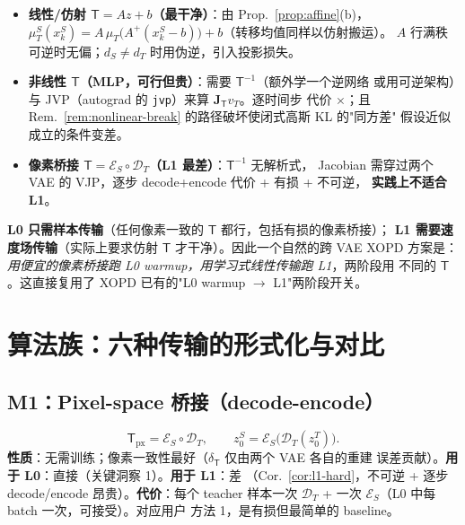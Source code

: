 \documentclass[11pt,a4paper]{article}
\newcommand{\Enc}{\mathcal{E}}
\newcommand{\Dec}{\mathcal{D}}
\newcommand{\Tmap}{\mathsf{T}}
\newcommand{\vT}{v_{T}}
\newcommand{\Jac}{\mathbf{J}}
\theoremstyle{definition}
\begin{document}
\begin{itemize}[leftmargin=1.4em]
\item \textbf{线性/仿射 $\Tmap=Az+b$（最干净）}：由 Prop.~\ref{prop:affine}(b)，
$\mu_T^S(x_k^S)=A\,\mu_T\big(A^{+}(x_k^S-b)\big)+b$（转移均值同样以仿射搬运）。
$A$ 行满秩可逆时无偏；$d_S\neq d_T$ 时用伪逆，引入投影损失。
\item \textbf{非线性 $\Tmap$（MLP，可行但贵）}：需要 $\Tmap^{-1}$（额外学一个逆网络
或用可逆架构）与 JVP（autograd 的 \texttt{jvp}）来算 $\Jac_{\Tmap}\vT$。逐时间步
代价 $\times$；且 Rem.~\ref{rem:nonlinear-break} 的路径破坏使闭式高斯 KL 的"同方差"
假设近似成立的条件变差。
\item \textbf{像素桥接 $\Tmap=\Enc_S\circ\Dec_T$（L1 最差）}：$\Tmap^{-1}$ 无解析式，
Jacobian 需穿过两个 VAE 的 VJP，逐步 decode+encode 代价 + 有损 + 不可逆，
\textbf{实践上不适合 L1}。
\end{itemize}

\begin{tcolorbox}[colback=green!4,colframe=green!50!black,title=关键洞察 2：L0/L1 对传输的要求是\emph{分层}的]
\textbf{L0 只需样本传输}（任何像素一致的 $\Tmap$ 都行，包括有损的像素桥接）；
\textbf{L1 需要速度场传输}（实际上要求仿射 $\Tmap$ 才干净）。因此一个自然的跨 VAE
XOPD 方案是：\emph{用便宜的像素桥接跑 L0 warmup，用学习式线性传输跑 L1}，两阶段用
不同的 $\Tmap$。这直接复用了 XOPD 已有的"L0 warmup $\to$ L1"两阶段开关。
\end{tcolorbox}

\section{算法族：六种传输的形式化与对比}
\label{sec:methods}

\subsection{M1：Pixel-space 桥接（decode-encode）}

\begin{equation}
\Tmap_{\mathrm{px}}=\Enc_S\circ\Dec_T,
\qquad
z_0^S=\Enc_S\big(\Dec_T(z_0^T)\big).
\end{equation}
\textbf{性质}：无需训练；像素一致性最好（$\delta_{\Tmap}$ 仅由两个 VAE 各自的重建
误差贡献）。\textbf{用于 L0}：直接（关键洞察 1）。\textbf{用于 L1}：差
（Cor.~\ref{cor:l1-hard}，不可逆 + 逐步 decode/encode 昂贵）。\textbf{代价}：每个
teacher 样本一次 $\Dec_T$ + 一次 $\Enc_S$（L0 中每 batch 一次，可接受）。对应用户
方法 1，是有损但最简单的 baseline。
\end{document}
